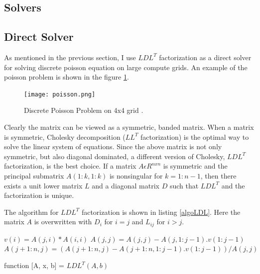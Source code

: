 \documentclass{article}
\begin{document}
\begin{spacing}{1.1}
\section{Solvers}

\subsection{Direct Solver}

As mentioned in the previous section, I use $LDL^T$ factorization as a direct solver for solving discrete poisson equation on large compute grids. An example of the poisson problem is shown in the figure \ref{poisson}.

\begin{center}
	\begin{figure}[H]
	\centering
       \texttt{[image: poisson.png]}
        \caption{\label{poisson} Discrete Poisson Problem on 4x4 grid \cite{Berkley1996}.} 
	\end{figure}
\end{center}

Clearly the matrix can be viewed as a symmetric, banded matrix. When a matrix is symmetric, Cholesky decomposition ($LL^T$ factorization) is the optimal way to solve the linear system of equations. Since the above matrix is not only symmetric, but also diagonal dominated, a different version of Cholesky, $LDL^T$ factorization, is the best choice. 
If a matrix $A\epsilon R^{nxn}$ is symmetric and the principal submatrix $A(1:k,1:k)$ is nonsingular for $k=1:n-1$, then there exists a unit lower matrix $L$ and a diagonal matrix $D$ such that $LDL^T$ and the factorization is unique. \cite{MatComp}

The algorithm for $LDL^T$ factorization is shown in listing \eqref{algoLDL}. Here the matrix $A$ is overwritten with $D_i$ for $i=j$ and $L_{ij}$ for $i>j$.
\begin{algorithm}[H]

\begin{algorithmic}[1]

\STATE $v(i) = A(j,i)*A(i,i)$ 
\ENDFOR
\STATE $A(j,j) = A(j,j) - A(j,1:j-1).v(1:j-1)$
\STATE $A(j+1:n,j) = (A(j+1:n, j) - A(j+1:n,1:j-1).v(1:j-1))/A(j,j) $ 
\ENDFOR
\end{algorithmic}
\caption{\label{algoLDL} function [A, x, b] = $LDL^T(A, b)$} 
\end{algorithm}


\end{spacing}
\end{document}
